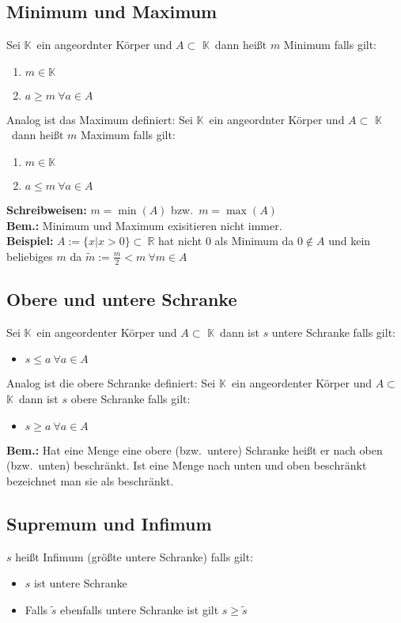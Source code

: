 \documentclass[10pt]{article}
\newcommand{\K}{$\mathbb{K}$}
\begin{document}
    \subsection{Minimum und Maximum}
    Sei \K\ ein angeordnter Körper und $A \subset$ \K\ dann heißt
    $m$ Minimum falls gilt:
    \begin{enumerate}
        \item $m \in \mathbb{K}$
        \item $a \geq m\ \forall a \in A$
    \end{enumerate}
    Analog ist das Maximum definiert:
    Sei \K\ ein angeordnter Körper und $A \subset$ \K\ dann heißt
    $m$ Maximum falls gilt:
    \begin{enumerate}
        \item $m \in \mathbb{K}$
        \item $a \leq m\ \forall a \in A$
    \end{enumerate}
    \textbf{Schreibweisen:}
    $m = \min{(A)}$ bzw.\ $m = \max{(A)}$\\
    \textbf{Bem.:}
    Minimum und Maximum exisitieren nicht immer.\\
    \textbf{Beispiel:} $A := \{x | x>0\}\subset\ \mathbb{R}$
    hat nicht 0 als Minimum da $0 \notin A$ und kein beliebiges $m$ da $\tilde{m} := \frac{m}{2} < m\ \forall m \in A$

    \subsection{Obere und untere Schranke}
    Sei \K\ ein angeordenter Körper und $A \subset$ \K\ dann ist $s$ untere
    Schranke falls gilt:
    \begin{itemize}
        \item $s \leq a\ \forall a \in A$
    \end{itemize}

     Analog ist die obere Schranke definiert:
    Sei \K\ ein angeordenter Körper und $A \subset$ \K\ dann ist $s$ obere
    Schranke falls gilt:
    \begin{itemize}
        \item $s \geq a\ \forall a \in A$
    \end{itemize}

    \textbf{Bem.:} Hat eine Menge eine obere (bzw.\ untere) Schranke
    heißt er nach oben (bzw.\ unten) beschränkt. Ist eine Menge nach unten und
    oben beschränkt bezeichnet man sie als beschränkt.

    \subsection{Supremum und Infimum}
    $s$ heißt Infimum (größte untere Schranke) falls gilt:
    \begin{itemize}
        \item $s$ ist untere Schranke
        \item Falls $\tilde{s}$ ebenfalls untere Schranke ist gilt
        $s\geq\tilde{s}$
    \end{itemize}
\end{document}
